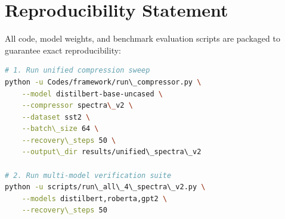 \section{Reproducibility Statement}
All code, model weights, and benchmark evaluation scripts are packaged to guarantee exact reproducibility:
\begin{lstlisting}[language=bash]
# 1. Run unified compression sweep
python -u Codes/framework/run\_compressor.py \
    --model distilbert-base-uncased \
    --compressor spectra\_v2 \
    --dataset sst2 \
    --batch\_size 64 \
    --recovery\_steps 50 \
    --output\_dir results/unified\_spectra\_v2

# 2. Run multi-model verification suite
python -u scripts/run\_all\_4\_spectra\_v2.py \
    --models distilbert,roberta,gpt2 \
    --recovery\_steps 50
\end{lstlisting}
